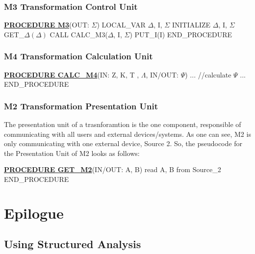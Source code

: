 \documentclass{article}
\begin{document}
\subsubsection{M3 Transformation Control Unit}
\begin{algorithmic}[H]
\STATE \underline{\textbf{PROCEDURE M3}}(OUT: $\Sigma$)
	\STATE LOCAL\_VAR $\Delta$, I, $\Sigma$
	\STATE INITIALIZE $\Delta$, I, $\Sigma$ 
	\STATE GET\_$\Delta(\Delta)$
	\STATE CALL CALC\_M3($\Delta$, I, $\Sigma$)
	\STATE PUT\_I(I)
\STATE END\_PROCEDURE
\end{algorithmic}

\subsubsection{M4 Transformation Calculation Unit}
\begin{algorithmic}[H]
\STATE \underline{\textbf{PROCEDURE CALC\_M4}}(IN: Z, K, T , $\Lambda$, IN/OUT: $\Psi$)
	\STATE ...
	\STATE //calculate $\Psi$
	\STATE ...
\STATE END\_PROCEDURE
\end{algorithmic}

\subsubsection{M2 Transformation Presentation Unit}
The presentation unit of a trasnforamtion is the one component, responsible of communicating with all users
and external devices/systems. As one can see, M2 is only communicating with one external device, Source 2.
So, the pseudocode for the Presentation Unit of M2 looks as follows:
\begin{algorithmic}[H]
\STATE \underline{\textbf{PROCEDURE GET\_M2}}(IN/OUT: A, B)
	\STATE read A, B from Source\_2
\STATE END\_PROCEDURE
\end{algorithmic}

\newpage
\section{Epilogue}

\subsection{Using Structured Analysis}  
\end{document}

